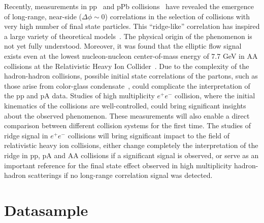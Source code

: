 \documentclass[aps,prl,twocolumn,showpacs,superscriptaddress,groupedaddress]{revtex4}  %
\begin{document}
Recently, measurements in pp~\cite{Khachatryan:2010gv} and pPb collisions~\cite{CMS:2012qk,Abelev:2012ola,Aad:2012gla} have revealed the emergence of long-range, near-side ($\Delta\phi\sim 0$) correlations in the selection of collisions with very high number of final state particles. This ``ridge-like'' correlation has inspired a large variety of theoretical models~\cite{Bzdak:2013zma,Dusling:2015gta}. The physical origin of the phenomenon is not yet fully understood. Moreover, it was found that the elliptic flow signal exists even at the lowest nucleon-nucleon center-of-mass energy of 7.7 GeV in AA collisions at the Relativistic Heavy Ion Collider~\cite{Adamczyk:2012ku}. 
Due to the complexity of the hadron-hadron collisions, possible initial state correlations of the partons, such as those arise from color-glass condensate~\cite{Gelis:2010nm, Dusling:2013qoz}, could complicate the interpretation of the pp and pA data. Studies of high multiplicity $e^+e^-$ collision, where the initial kinematics of the collisions are well-controlled, could bring significant insights about the observed phenomenon. These measurements will also enable a direct comparison between different collision systems for the first time. The studies of ridge signal in $e^+e^-$ collisions will bring significant impact to the field of relativistic heavy ion collisions, either change completely the interpretation of the ridge in pp, pA and AA collisions if a significant signal is observed, or serve as an important reference for the final state effect observed in high multiplicity hadron-hadron scatterings if no long-range correlation signal was detected. 

\section{\label{sec:datasample}Datasample}
\end{document}

